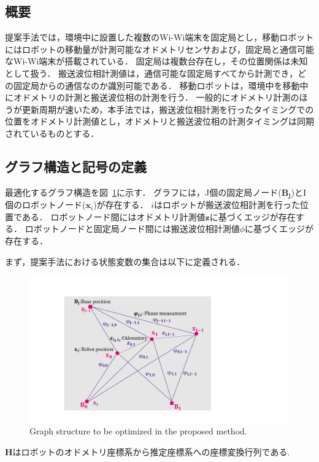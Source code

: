 \documentclass[a4jsme]{jsmepaper}
\newcommand\figref[1]{図~\ref{fig:#1}}
\begin{document}
\subsection{概要}
提案手法では，環境中に設置した複数のWi-Wi端末を固定局とし，移動ロボットにはロボットの移動量が計測可能なオドメトリセンサおよび，固定局と通信可能なWi-Wi端末が搭載されている．
固定局は複数台存在し，その位置関係は未知として扱う．
搬送波位相計測値は，通信可能な固定局すべてから計測でき，どの固定局からの通信なのか識別可能である．
移動ロボットは，環境中を移動中にオドメトリの計測と搬送波位相の計測を行う．
一般的にオドメトリ計測のほうが更新周期が速いため，本手法では，搬送波位相計測を行ったタイミングでの位置をオドメトリ計測値とし，オドメトリと搬送波位相の計測タイミングは同期されているものとする．

\subsection{グラフ構造と記号の定義}
最適化するグラフ構造を\figref{graph_structure}に示す．
グラフには，J個の固定局ノード($\mathbf{B_j}$)とI個のロボットノード($\mathbf{x}_i$)が存在する．
$i$はロボットが搬送波位相計測を行った位置である．
ロボットノード間にはオドメトリ計測値$\mathbf{z}$に基づくエッジが存在する．
ロボットノードと固定局ノード間には搬送波位相計測値$\phi$に基づくエッジが存在する．

まず，提案手法における状態変数の集合は以下に定義される．
\begin{figure}[tb]
    \centering
    \includegraphics[width=0.95\linewidth]{figures/graph.pdf}
    \caption{Graph structure to be optimized in the proposed method.}
    \label{fig:graph_structure}
\end{figure}
$\mathbf{H}$はロボットのオドメトリ座標系から推定座標系への座標変換行列である.
\end{document}
